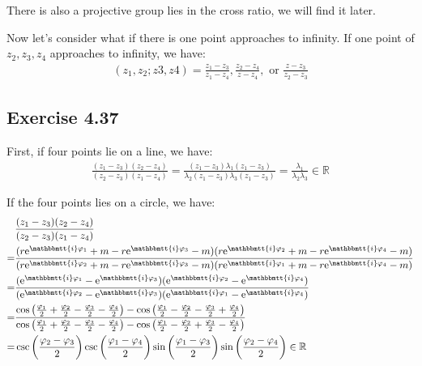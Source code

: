 \documentclass[]{ctexart}
\newcommand{\mi}{\mathbbmtt{i}}
\newcommand{\me}{\mathrm{e}}
\begin{document}
			There is also a projective group lies in the cross ratio, we will find it later. 
			
			Now let's consider what if there is one point approaches to infinity. If one point of $z_2,z_3,z_4$ approaches to infinity, we have:
				\begin{equation*}
				\begin{aligned}
					(z_1,z_2;z3,z4)=\frac{z_1-z_3}{z_1-z_4},\frac{z_2-z_4}{z-z_4},\text{ or }\frac{z-z_3}{z_2-z_3}
				\end{aligned}
				\end{equation*}
	
	\subsection{Exercise 4.37}
		First, if four points lie on a line, we have: 
			\begin{equation*}
			\begin{aligned}
				\frac{(z_1-z_3)(z_2-z_4)}{(z_2-z_3)(z_1-z_4)}=\frac{(z_1-z_3)\lambda_{1}(z_1-z_3)}{\lambda_{2}(z_1-z_3)\lambda_{3}(z_1-z_3)}=\frac{\lambda_{1}}{\lambda_{2}\lambda_{3}}\in \mathbb{R}
			\end{aligned}
			\end{equation*}
			
		If the four points lies on a circle, we have:
			\begin{equation*}
			\begin{aligned}
				&\frac{(z_1-z_3)(z_2-z_4)}{(z_2-z_3)(z_1-z_4)}\\
				=&\frac{(r\me^{\mi\varphi_1}+m-r\me^{\mi\varphi_3}-m)(r\me^{\mi\varphi_2}+m-r\me^{\mi\varphi_4}-m)}{(r\me^{\mi\varphi_2}+m-r\me^{\mi\varphi_3}-m)(r\me^{\mi\varphi_1}+m-r\me^{\mi\varphi_4}-m)}\\
				=&\frac{(\me^{\mi\varphi_1}-\me^{\mi\varphi_3})(\me^{\mi\varphi_2}-\me^{\mi\varphi_4})}{(\me^{\mi\varphi_2}-\me^{\mi\varphi_3})(\me^{\mi\varphi_1}-\me^{\mi\varphi_4})}\\
				=&\frac{\cos \left(\frac{\varphi_1}{2}+\frac{\varphi_2}{2}-\frac{\varphi_3}{2}-\frac{\varphi_4}{2}\right)-\cos \left(\frac{\varphi_1}{2}-\frac{\varphi_2}{2}-\frac{\varphi_3}{2}+\frac{\varphi_4}{2}\right)}{\cos \left(\frac{\varphi_1}{2}+\frac{\varphi_2}{2}-\frac{\varphi_3}{2}-\frac{\varphi_4}{2}\right)-\cos \left(\frac{\varphi_1}{2}-\frac{\varphi_2}{2}+\frac{\varphi_3}{2}-\frac{\varphi_4}{2}\right)}\\
				=&\csc\left(\frac{\varphi_2-\varphi_3}{2}\right)\csc\left(\frac{\varphi_1-\varphi_4}{2}\right)\sin\left(\frac{\varphi_1-\varphi_3}{2}\right)\sin\left(\frac{\varphi_2-\varphi_4}{2}\right)\in \mathbb{R}
			\end{aligned}
			\end{equation*}
			
\end{document}
